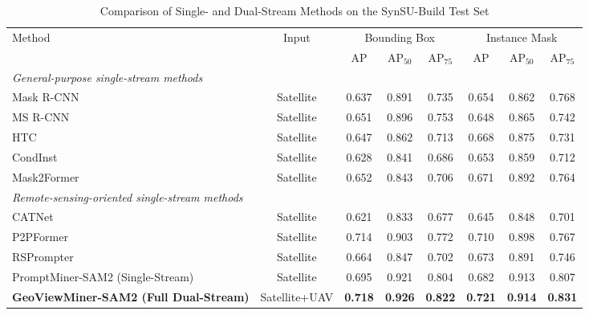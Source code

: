 \documentclass[letterpaper,journal]{IEEEtran}
\begin{document}
\begin{table}[!t]
\caption{Comparison of Single- and Dual-Stream Methods on the SynSU-Build Test Set}
\label{tab:synsu_dual}
\centering
\small
\begin{tabular}{lccccccc}
\toprule
\multirow{2}{*}{Method} & \multirow{2}{*}{Input} & \multicolumn{3}{c}{Bounding Box} & \multicolumn{3}{c}{Instance Mask} \\
\cmidrule(lr){3-5}\cmidrule(lr){6-8}
& & AP & AP$_{50}$ & AP$_{75}$ & AP & AP$_{50}$ & AP$_{75}$ \\
\midrule
\multicolumn{8}{l}{\textit{General-purpose single-stream methods}} \\
Mask R-CNN~\cite{ref_maskrcnn} & Satellite & 0.637 & 0.891 & 0.735 & 0.654 & 0.862 & 0.768 \\
MS R-CNN~\cite{ref_msrcnn} & Satellite & 0.651 & 0.896 & 0.753 & 0.648 & 0.865 & 0.742 \\
HTC~\cite{ref_htc} & Satellite & 0.647 & 0.862 & 0.713 & 0.668 & 0.875 & 0.731 \\
CondInst~\cite{ref_condinst} & Satellite & 0.628 & 0.841 & 0.686 & 0.653 & 0.859 & 0.712 \\
Mask2Former~\cite{ref_mask2former} & Satellite & 0.652 & 0.843 & 0.706 & 0.671 & 0.892 & 0.764 \\
\midrule
\multicolumn{8}{l}{\textit{Remote-sensing-oriented single-stream methods}} \\
CATNet~\cite{ref_catnet} & Satellite & 0.621 & 0.833 & 0.677 & 0.645 & 0.848 & 0.701 \\
P2PFormer~\cite{ref_p2pformer} & Satellite & 0.714 & 0.903 & 0.772 & 0.710 & 0.898 & 0.767 \\
RSPrompter~\cite{ref_rsprompter} & Satellite & 0.664 & 0.847 & 0.702 & 0.673 & 0.891 & 0.746 \\
\midrule
PromptMiner-SAM2 (Single-Stream) & Satellite & 0.695 & 0.921 & 0.804 & 0.682 & 0.913 & 0.807 \\
\textbf{GeoViewMiner-SAM2 (Full Dual-Stream)} & Satellite+UAV & \textbf{0.718} & \textbf{0.926} & \textbf{0.822} & \textbf{0.721} & \textbf{0.914} & \textbf{0.831} \\
\bottomrule
\end{tabular}
\end{table}
\end{document}
